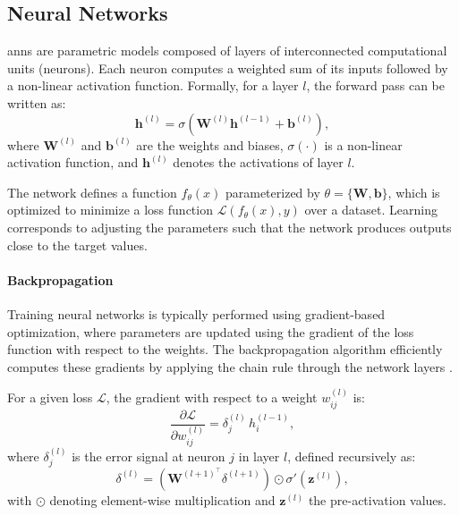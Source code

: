 \subsection{Neural Networks}\label{sec:neural_networks}

\glspl{ann} are parametric models composed of layers of interconnected computational units (neurons). Each neuron computes a weighted sum of its inputs followed by a non-linear activation function. Formally, for a layer $l$, the forward pass can be written as:
\begin{equation}
    \mathbf{h}^{(l)} = \sigma\left(\mathbf{W}^{(l)} \mathbf{h}^{(l-1)} + \mathbf{b}^{(l)}\right),
\end{equation}
where $\mathbf{W}^{(l)}$ and $\mathbf{b}^{(l)}$ are the weights and biases, $\sigma(\cdot)$ is a non-linear activation function, and $\mathbf{h}^{(l)}$ denotes the activations of layer $l$.

The network defines a function $f_\theta(x)$ parameterized by $\theta = \{\mathbf{W}, \mathbf{b}\}$, which is optimized to minimize a loss function $\mathcal{L}(f_\theta(x), y)$ over a dataset. Learning corresponds to adjusting the parameters such that the network produces outputs close to the target values.

\paragraph{Backpropagation}

Training neural networks is typically performed using gradient-based optimization, where parameters are updated using the gradient of the loss function with respect to the weights. The backpropagation algorithm efficiently computes these gradients by applying the chain rule through the network layers \citet{Schmidhuber2015}.

For a given loss $\mathcal{L}$, the gradient with respect to a weight $w_{ij}^{(l)}$ is:
\begin{equation}
    \frac{\partial \mathcal{L}}{\partial w_{ij}^{(l)}} = \delta_j^{(l)} \, h_i^{(l-1)},
\end{equation}
where $\delta_j^{(l)}$ is the error signal at neuron $j$ in layer $l$, defined recursively as:
\begin{equation}
    \delta^{(l)} = \left( \mathbf{W}^{(l+1)^\top} \delta^{(l+1)} \right) \odot \sigma'\left(\mathbf{z}^{(l)}\right),
\end{equation}
with $\odot$ denoting element-wise multiplication and $\mathbf{z}^{(l)}$ the pre-activation values.

